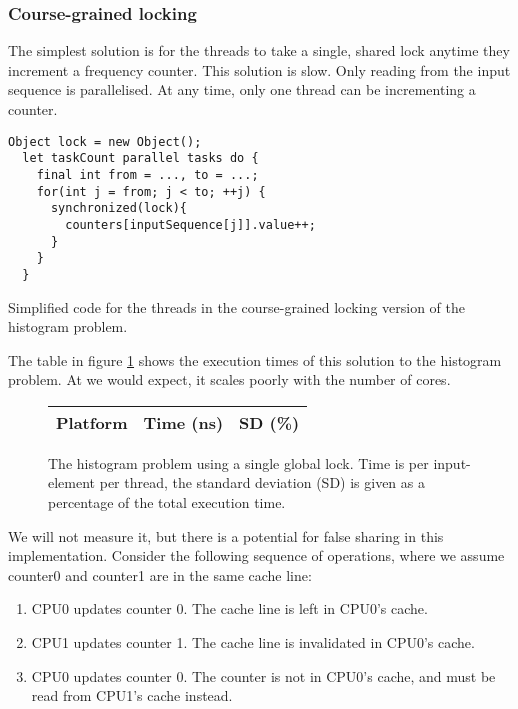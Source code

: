 \subsubsection{Course-grained locking}
The simplest solution is for the threads to take a single, shared lock anytime
they increment a frequency counter. This solution is slow. Only reading
from the input sequence is parallelised. At any time,
only one thread can be incrementing a counter.

\begin{code}
\begin{Verbatim}[frame=single]
  Object lock = new Object();
  let taskCount parallel tasks do {
    final int from = ..., to = ...;
    for(int j = from; j < to; ++j) {
      synchronized(lock){
        counters[inputSequence[j]].value++;
      }
    }
  }
\end{Verbatim}
	\caption{Simplified code for the threads in the course-grained locking
	version of the histogram problem.}
\end{code}

The table in figure \ref{table:histo-global} shows the execution times of this
solution to the histogram problem. At we would expect, it scales poorly with the number of cores.

\begin{figure}[hbtp]
	\centering
	\begin{tabular}{l r r}
		\hline
		\hline
		Platform & Time (ns) & SD (\%) \\
		\hline
		
		\hline
		\hline
	\end{tabular}
	\caption{The histogram problem using a single global lock. Time is per
	input-element per thread, the standard deviation (SD) is given as a
	percentage of the total execution time.}
	\label{table:histo-global}
\end{figure}

We will not measure it, but there is a potential for false sharing in this
implementation. Consider the following sequence of operations, where we assume
counter0 and counter1 are in the same cache line:

\begin{enumerate}
	\item CPU0 updates counter 0. The cache line is left in CPU0's cache.
	\item \label{list:invalidation} CPU1 updates counter 1. The cache line is invalidated in CPU0's
		cache.
	\item \label{list:unneededread} CPU0 updates counter 0. The counter is not in CPU0's cache, and
		must be read from CPU1's cache instead.
\end{enumerate}

